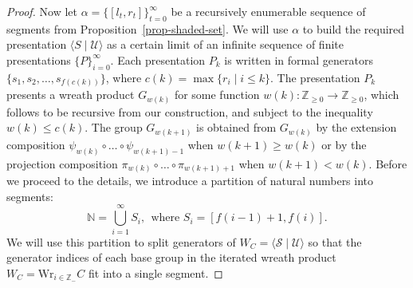 \documentclass[10pt,a4paper]{amsart}
\begin{document}
\begin{proof}



\smallskip

Now let $\alpha=\{[l_t,r_t]\}_{t=0}^\infty$ be a recursively enumerable sequence of segments from Proposition~\ref{prop-shaded-set}. We will use $\alpha$ to build the required presentation $\langle S \mid \mathcal U \rangle$ as a certain limit
of an infinite sequence of finite presentations $\{P\}_{i=0}^{\infty}$. Each presentation $P_k$ is written in formal generators $\{s_1,s_2,\ldots,s_{f(c(k))}\}$, where $c(k)=\max\{r_i \mid i\leq k\}.$ The presentation $P_k$ presents a wreath product $G_{w(k)}$ for some function $w(k): \mathbb Z_{\geq 0} \to \mathbb Z_{\geq 0}$, which follows to be recursive from our construction, and subject to the inequality $w(k)\leq c(k)$. The group $G_{w(k+1)}$ is obtained from $G_{w(k)}$ by the extension composition $\psi_{w(k)}\circ\ldots\circ\psi_{w(k+1)-1}$ when $w(k+1)\geq w(k)$ or by the projection composition $\pi_{w(k)}\circ\ldots\circ\pi_{w(k+1)+1}$ when $w(k+1)<w(k)$. Before we proceed to the details, we introduce a partition of natural numbers into segments: 
\[
\mathbb N = \bigcup_{i=1}^{\infty} S_i, \ \ \text{where } S_i=[f(i-1)+1,f(i)].
\]
We will use this partition to split generators of $W_C=\langle \mathcal S \mid \mathcal U \rangle$ so that the generator indices of each base group in the iterated wreath product $W_C=\text{Wr}_{i\in \mathbb Z_-}C$ fit into a single segment.


\end{proof}
\end{document}

